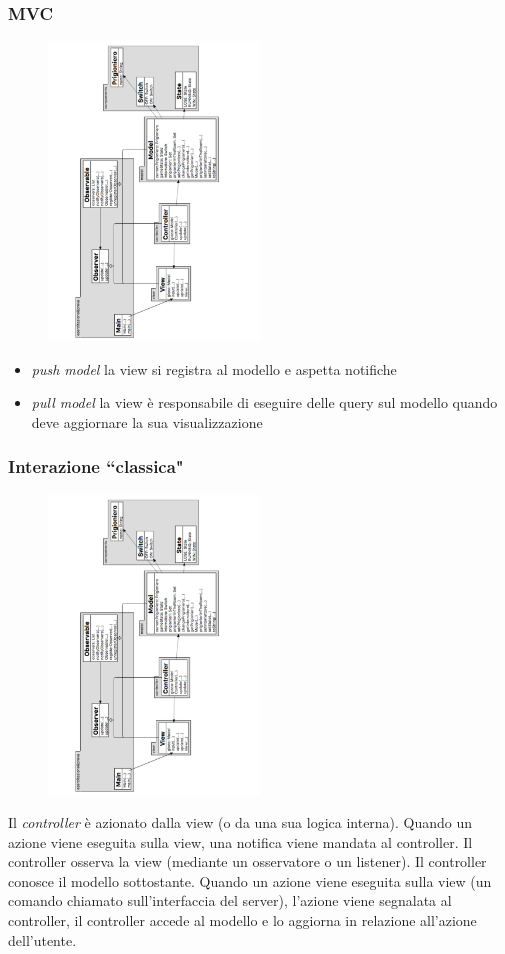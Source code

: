 \documentclass{beamer}
\begin{document}
\begin{frame}
\frametitle{MVC}
\begin{figure}
\centering
\includegraphics[width=0.5\textwidth]{Img/MVC.pdf}
\end{figure}
\begin{itemize}
\item \emph{push model} la view si registra al modello e aspetta notifiche
\item \emph{pull model} la view \`e responsabile di eseguire delle query sul modello quando deve aggiornare la sua visualizzazione
\end{itemize}
\end{frame}

\begin{frame}
\frametitle{Interazione ``classica"}
\begin{figure}
\centering
\includegraphics[width=0.5\textwidth]{Img/MVC.pdf}
\end{figure}
Il \emph{controller} \`e azionato dalla view (o da una sua logica interna). Quando un azione viene eseguita sulla view, una notifica viene mandata al controller. Il controller osserva la view (mediante un osservatore o un listener). Il controller conosce il modello sottostante. Quando un azione viene eseguita sulla view (un comando chiamato sull'interfaccia del server), l'azione viene segnalata al controller, il controller accede al modello e lo aggiorna in relazione all'azione dell'utente.
\end{frame}
\end{document}
